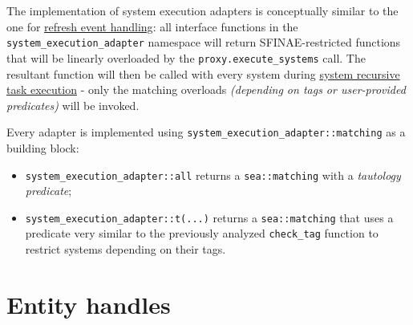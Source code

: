 \documentclass[twoside, 12pt, a4paper, openany]{book}
\begin{document}
The implementation of system execution adapters is conceptually similar
to the one for \protect\hyperlink{advf_refresh_event_handling}{refresh
event handling}: all interface functions in the
\texttt{system_execution_adapter}
namespace will return SFINAE-restricted functions that will be linearly
overloaded by the
\texttt{proxy.execute_systems}
call. The resultant function will then be called with every system
during
\protect\hyperlink{multithreading_recursive_task_execution}{system
recursive task execution} - only the matching overloads \emph{(depending
on tags or user-provided predicates)} will be invoked.

Every adapter is implemented using
\texttt{system_execution_adapter::matching}
as a building block:

\begin{itemize}
\item
  \texttt{system_execution_adapter::all}
  returns a
  \texttt{sea::matching}
  with a \emph{tautology predicate};
\item
  \texttt{system_execution_adapter::t(...)}
  returns a
  \texttt{sea::matching}
  that uses a predicate very similar to the previously analyzed
  \texttt{check_tag}
  function to restrict systems depending on their tags.
\end{itemize}

\section{Entity handles}\label{entity-handles}
\end{document}
